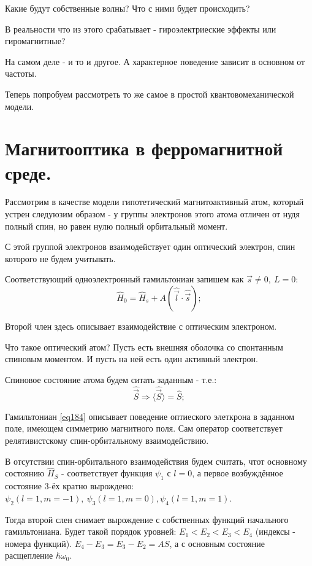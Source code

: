 \documentclass[a4paper, 14pt, russian]{article}
\newcommand{\be}{\begin{equation}}
\newcommand{\ee}{\end{equation}}
\begin{document}
	Какие будут собственные волны? Что с ними будет происходить?


	В реальности что из этого срабатывает - гироэлектриеские эффекты или
	гиромагнитные?

	На самом деле - и то и другое. А характерное поведение зависит 
	в основном от частоты.

	Теперь попробуем рассмотреть то же самое в простой квантовомеханической 
	модели.
	
	\section{Магнитооптика в ферромагнитной среде.}

	Рассмотрим в качестве модели гипотетический магнитоактивный атом, который устрен 
	следуюзим образом - у группы электронов этого атома отличен от нудя полный спин,
	но равен нулю полный орбитальный момент.
	
	С этой группой электронов взаимодействует один оптический электрон, спин
	которого не будем учитывать.

	Соответствующий одноэлектронный гамильтониан запишем как $\vec s \neq 0,~L=0$:
	\be
		\label{eq184}
		\hat{H}_0 = \hat{H}_s + A(\hat{\vec l} \cdot \hat{\vec s});
	\ee

	Второй член здесь описывает взаимодействие с оптическим электроном.

	Что такое оптический атом? Пусть есть внешняя оболочка со спонтанным спиновым моментом. И пусть на ней есть один активный электрон.

	Спиновое состояние атома будем ситать заданным - т.е.:
	\be
		\hat{\vec S} \Rightarrow \langle \hat{\vec S} \rangle = \hat{S};
	\ee

	Гамильтониан \ref{eq184} описывает поведение оптиеского элеткрона в заданном поле,
	имеющем симметрию магнитного поля. Сам оператор соответствует релятивистскому 
	спин-орбитальному взаимодействию.

	В отсутствии спин-орбитального взаимодействия будем считать, чтот основному состоянию $\hat{H}_S$ - соответствует функция $\psi_1$  с $l=0$, а первое возбуждённое состояние 3-ёх кратно вырождено: $\psi_2(l=1, m = -1),~\psi_3(l=1,m=0),
	\psi_4(l=1,m=1)$.

	Тогда второй слен снимает вырождение с собственных функций начального гамильтониана.
	Будет такой порядок уровней: $E_1 < E_2 < E_3 < E_4$ (индексы - номера функций).
	$E_4 - E_3 = E_3 - E_2 = AS$, а с основным состояние расщепление $\hbar \omega_0$.
\end{document}
